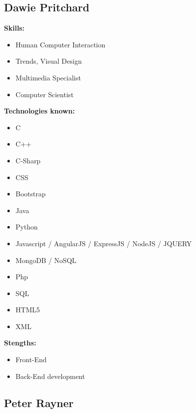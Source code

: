 \documentclass{article}
\begin{document}
\subsection{Dawie Pritchard}
\textbf{Skills:}
\begin{itemize}
 	\item Human Computer Interaction
 	\item Trends, Visual Design 
 	\item Multimedia Specialist
 	\item Computer Scientist
\end {itemize}
\textbf{Technologies known:}
\begin{itemize}
	\item C
 	\item C++
 	\item C-Sharp
 	\item CSS
 	\item Bootstrap
 	\item Java
 	\item Python
 	\item Javascript / AngularJS / ExpressJS / NodeJS / JQUERY
 	\item MongoDB / NoSQL
 	\item Php
 	\item SQL
 	\item HTML5
 	\item XML
 \end{itemize}
\textbf{Stengths:} 
\begin{itemize}
	\item Front-End
	\item Back-End development
\end{itemize}

\newpage
\subsection {Peter Rayner}
\end{document}
